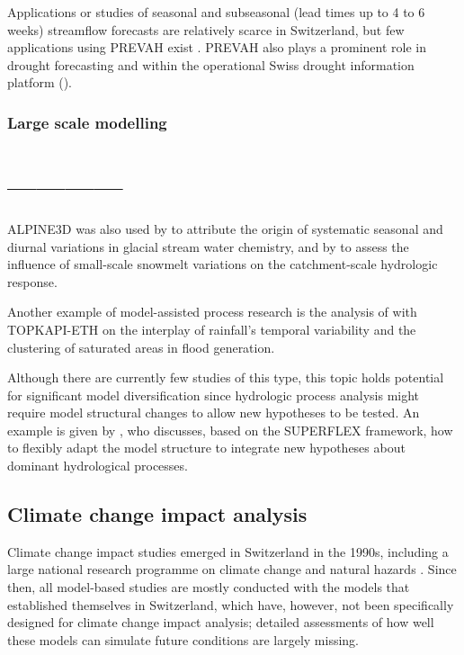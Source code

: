 \documentclass[10pt,a4paper]{article}
\begin{document}
Applications or studies of seasonal and subseasonal (lead times up to 4 to 6 weeks) streamflow forecasts are relatively scarce in Switzerland, but few applications using PREVAH exist \citep[][]{Monhart_2019, Anghileri2019}. PREVAH also plays a prominent role in drought forecasting \citep{Fundel2013, Jorg-Hess2015, Bogner2018b} and within the operational Swiss drought information platform (\citealp{Stahli2013}). 


\subsubsection{Large scale modelling}
\label{sec:application:largescale}



\section{------------}


ALPINE3D was also used by \citet{Hindshaw2011} to attribute the origin of systematic seasonal and diurnal variations in glacial stream water chemistry, and by \citet{Brauchli2017} to assess the influence of small-scale snowmelt variations on the catchment-scale hydrologic response.

Another example of model-assisted process research is the analysis of \citet{Paschalis_2014} with TOPKAPI-ETH on the interplay of rainfall's temporal variability and the clustering of saturated areas in flood generation.

Although there are currently few studies of this type, this topic holds potential for significant model diversification since hydrologic process analysis might require model structural changes to allow new hypotheses to be tested. An example is given by \citet{DalMolin2020}, who discusses, based on the SUPERFLEX framework, how to flexibly adapt the model structure to integrate new hypotheses about dominant hydrological processes.



\subsection{Climate change impact analysis}
\label{sec:application:climatechange}

Climate change impact studies emerged in Switzerland in the 1990s, including a large national research programme on climate change and natural hazards \citep{snfs}. Since then, all model-based studies are mostly conducted with the models that established themselves in Switzerland, which have, however, not been specifically designed for climate change impact analysis; detailed assessments of how well these models can simulate future conditions are largely missing.
\end{document}
